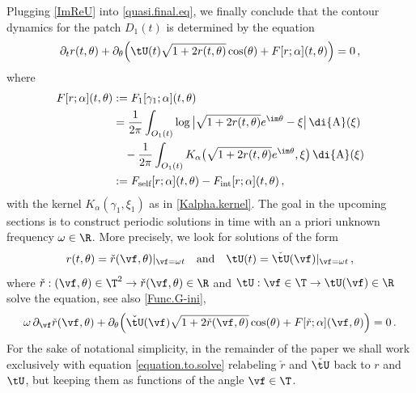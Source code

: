\documentclass[a4paper,reqno,10pt]{article}
\newcommand{\pa}{\partial}
\newcommand{\wrta}{\,\di {\rm A}}
\begin{document}
Plugging \eqref{ImReU} into \eqref{quasi.final.eq}, we finally conclude that the contour dynamics for the patch $D_1(t)$ is determined by the equation
\begin{equation}\label{the.equation}
	\begin{aligned}
 \pa_{t} r(t,\theta) +   \pa_{\theta}\Big(  \tU(t)  \sqrt{1+2 r(t,\theta)}\cos(\theta ) + F[ r ;\alpha ](t,\theta) \Big) = 0 \,,
	\end{aligned}
\end{equation}
where
\begin{equation}\label{F.app}
	\begin{aligned}
		F[r;\alpha](t,\theta) & := F_1[\gamma_{1};\alpha](t,\theta) \\
& =   \frac{1}{2\pi} \int_{O_{1}(t)} \log \big|  \sqrt{1+2r(t,\theta)}e^{\im\theta} -\xi \big| \wrta(\xi) 
\\
		& \quad - \frac{1}{2\pi} \int_{O_{1}(t)} K_\alpha\big(\sqrt{1+2 r(t,\theta)}e^{\im\theta},\xi\big) \wrta(\xi)\\       
        &:= F_{\textnormal{self}}[r;\alpha](t,\theta)-F_{\textnormal{int}}[r;\alpha](t,\theta)\,,
	\end{aligned}
\end{equation}
with  the kernel $K_\alpha(\gamma_{1},\xi_{1})$ as in \eqref{Kalpha.kernel}. %
The goal in the upcoming sections is to construct periodic solutions in time with an a priori unknown  frequency $\omega\in\R$. More precisely, we look for solutions of the form
$$ r(t,\theta)=\check{r}(\vf,\theta)|_{\vf=\omega t}\quad\hbox{and}\quad \tU(t)=\check{\tU}(\vf)|_{\vf=\omega t} \,,
$$
where  $\check{r}:(\vf,\theta)\in\T^2\to \check{r}(\vf,\theta)\in\R$ and $\tU: \vf\in\T\to \tU(\vf)\in\R$ solve the equation, see also \eqref{Func.G-ini},
\begin{equation}\label{equation.to.solve}
		\omega\,\pa_{\vf} \check{r}(\vf,\theta) +  \pa_{\theta}  \Big( \check{\tU}(\vf) \sqrt{1+2\check{r}(\vf,\theta)} \cos(\theta)  + F[\check{r};\alpha](\vf,\theta) \Big) =0\,.
\end{equation}
For the sake of notational simplicity, in the remainder of the paper we shall work exclusively with equation
 \eqref{equation.to.solve} relabeling $\check{r}$ and $\check{\tU}$ back to $r$ and $\tU$, but keeping them as functions of the angle $\vf\in\T$.

\smallskip
 
\end{document}
